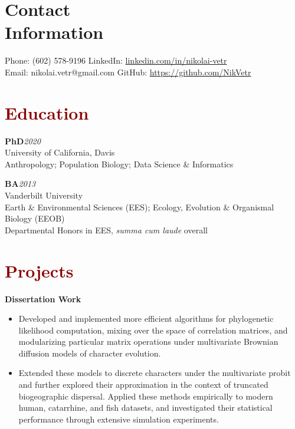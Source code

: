 \documentclass[11pt,margin,line]{resume}
\begin{document}
\name{\huge \textcolor{DarkRed}{Nikolai Vetr}}
\begin{resume}
\vspace{-2mm}
\section{\mysidestyle Contact\\Information}
    Phone: (602) 578-9196       \hfill LinkedIn: \url{linkedin.com/in/nikolai-vetr} \\
\noindent Email: nikolai.vetr@gmail.com  \hfill GitHub: \url{https://github.com/NikVetr} \vspace{0mm}\\\vspace{-4.5mm}

\section{\large\textcolor{DarkRed}{Education}}
   
\textbf{PhD}\hfill\emph{2020}\\
University of California, Davis\\
Anthropology; Population Biology; Data Science \& Informatics
\vspace{-0.25em}

\textbf{BA}\hfill\emph{2013}\\
Vanderbilt University\\
Earth \& Environmental Sciences (EES); Ecology, Evolution \& Organismal Biology (EEOB)\\
Departmental Honors in EES, \textit{summa cum laude} overall\\
\vspace{-1.25em}

\section{\large\textcolor{DarkRed}{Projects}}

\textbf{Dissertation Work}
\begin{itemize}[noitemsep]
\item Developed and implemented more efficient algorithms for phylogenetic likelihood computation, mixing over the space of correlation matrices, and modularizing particular matrix operations under multivariate Brownian diffusion models of character evolution.
\item Extended these models to discrete characters under the multivariate probit and further explored their approximation in the context of truncated biogeographic dispersal. Applied these methods empirically to modern human, catarrhine, and fish datasets, and investigated their statistical performance through extensive simulation experiments. 
\end{itemize}


\end{resume}
\end{document}
